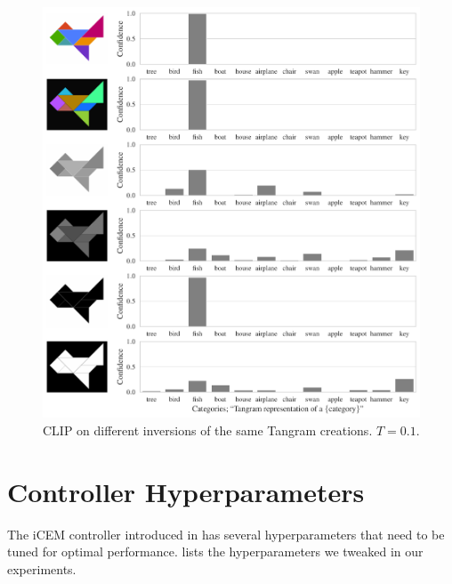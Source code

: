 \newpage
\begin{figure}[H]
    \centering
    \includegraphics[width=\textwidth]{images/tangram_fish_10.pdf}
    \caption{CLIP on different inversions of the same Tangram creations. \(T = 0.1\).}
    \label{fig:clip-tangram-inversions}
\end{figure}


\chapter{Controller Hyperparameters}
\label{sec:icem-details}
The iCEM controller introduced in  has several hyperparameters that need to be tuned for optimal performance.
 lists the hyperparameters we tweaked in our experiments.

